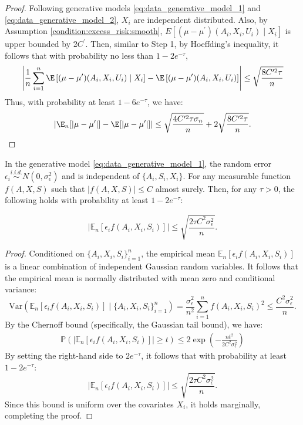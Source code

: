 \begin{proof}
\noindent Following generative models \eqref{eq:data_generative_model_1} and \eqref{eq:data_generative_model_2}, $X_i$ are independent distributed. Also, by Assumption \ref{condition:excess_risk:smooth}, $E\left[(\mu - \mu^\prime)(A_i,X_i,U_i)\mid X_i\right]$ is upper bounded by $2C^{\prime}$. Then, similar to Step 1, by Hoeffding's inequality, it follows that with probability no less than $1-2e^{-\tau}$,  
$$\left|\frac{1}{n}\sum_{i=1}^n\E\left[(\mu - \mu^\prime)(A_i,X_i,U_i)\mid X_i\right] - \E\left[(\mu - \mu^\prime)(A_i,X_i,U_i)\right]\right|\leq \sqrt{\frac{8C^{\prime2}\tau}{n}} $$
 Thus, with probability at least $1 - 6e^{-\tau}$, we have:
$$\left|\E_n[|\mu-\mu^\prime|]-\E[|\mu-\mu^\prime|]\right|\leq \sqrt{\frac{4C^{\prime2}\tau\sigma_n}{n}} + 2\sqrt{\frac{8C^{\prime2}\tau}{n}}.$$ 

\end{proof}

\begin{lemma}\label{lemma:noise_concentration}

In the generative model \eqref{eq:data_generative_model_1}, the random error $\epsilon_i \overset{i.i.d.}{\sim} N(0, \sigma_\epsilon^2)$ and is independent of $\{A_i, S_i, X_i\}$. For any measurable function $f(A, X, S)$ such that $|f(A, X, S)| \leq C$ almost surely. Then, for any $\tau > 0$, the following holds with probability at least $1 - 2e^{-\tau}$:

$$\left| \mathbb{E}_n[\epsilon_i f(A_i, X_i, S_i)] \right| \leq \sqrt{\frac{2\tau C^2 \sigma_\epsilon^2}{n}}.$$
    
\end{lemma}

\begin{proof}

Conditioned on $\{A_i, X_i, S_i\}_{i=1}^n$, the empirical mean $\mathbb{E}_n[\epsilon_i f(A_i, X_i, S_i)]$ is a linear combination of independent Gaussian random variables. It follows that the empirical mean is normally distributed with mean zero and conditional variance:
$$\text{Var}\left( \mathbb{E}_n[\epsilon_i f(A_i, X_i, S_i)] \mid \{A_i, X_i, S_i\}_{i=1}^n \right) = \frac{\sigma_\epsilon^2}{n^2} \sum_{i=1}^n f(A_i, X_i, S_i)^2 \leq \frac{C^2 \sigma_\epsilon^2}{n}.$$
By the Chernoff bound (specifically, the Gaussian tail bound), we have:
\begin{align*} \mathbb{P}\left(\left|\mathbb{E}_n\left[\epsilon_i f(A_i,X_i,S_i)\right]\right|\geq t\right) \leq 2 \exp\left( -\frac{nt^2}{2C^2\sigma_\epsilon^2} \right) \end{align*}
By setting the right-hand side to $2e^{-\tau}$, it follows that with probability at least $1 - 2e^{-\tau}$:
$$\left|\mathbb{E}_n\left[\epsilon_i f(A_i,X_i,S_i)\right]\right|\leq \sqrt{\frac{2\tau C^2\sigma_\epsilon^2}{n}}.$$
Since this bound is uniform over the covariates $X_i$, it holds marginally, completing the proof.
\end{proof}

